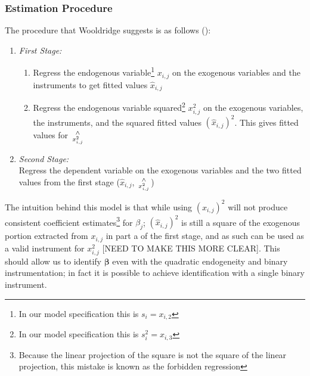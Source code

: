 \documentclass[12pt]{article}
\begin{document}
\subsubsection{Estimation Procedure}
The procedure that Wooldridge suggests is as follows (\cite{wooldridge}):
\begin{spacing}{1}
\begin{enumerate}[label={(\arabic*)}]
	\item \textit{First Stage:}
	\begin{enumerate}
		\item Regress the endogenous variable\footnote{In our model specification this is $s_i = x_{i,2}$} $x_{i,j}$ on the exogenous variables and the instruments to get fitted values $\hat{x}_{i,j}$
		\item Regress the endogenous variable squared\footnote{In our model specification this is $s_i^2 = x_{i,3}$} $x_{i,j}^2$ on the exogenous variables, the instruments, and the squared fitted values $(\hat{x}_{i,j})^2$. This gives fitted values for ${\wedge \atop x_{i,j}^2}$ 
	\end{enumerate} 
	\item \textit{Second Stage:} \\
	Regress the dependent variable on the exogenous variables and the two fitted values from the first stage ($\hat{x}_{i,j}$, ${\wedge \atop x_{i,j}^2}$)
\end{enumerate}
\end{spacing}
\noindent The intuition behind this model is that while using $(\hat{x}_{i,j})^2$ will not produce consistent coefficient estimates\footnote{Because the linear projection of the square is not the square of the linear projection, this mistake is known as the forbidden regression} for $\beta_j$; $(\hat{x}_{i,j})^2$ is still a square of the exogenous portion extracted from $x_{i,j}$ in part a of the first stage, and as such can be used as a valid instrument for $x_{i,j}^2$ \textcolor{BrickRed}{[NEED TO MAKE THIS MORE CLEAR]}. This should allow us to identify $\bm{\beta}$ even with the quadratic endogeneity and binary instrumentation; in fact it is possible to achieve identification with a single binary instrument.

\end{document}

